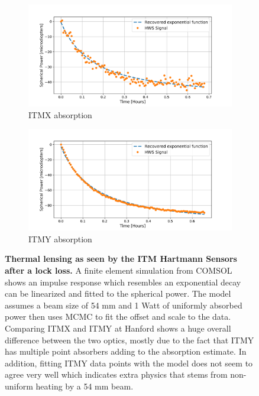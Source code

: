 	\begin{figure}[!]
		\centering
		\begin{subfigure}[a]{0.8\textwidth}
			\centering
			\includegraphics[width=\textwidth]{../Figures/MCMC_ITMX_ABS_FIT.png}
			\caption{ITMX absorption}
			\label{fig:itmx_abs}
		\end{subfigure}
		\hfill
		\begin{subfigure}[b]{0.8\textwidth}
			\centering
			\includegraphics[width=\textwidth]{../Figures/MCMC_ITMY_ABS_FIT.png}
			\caption{ITMY absorption}
			\label{fig:itmy_abs}
		\end{subfigure}
		\caption[Thermal lensing as seen by the ITM Hartmann Sensors after a lock loss.]  
		{\textbf{Thermal lensing as seen by the ITM Hartmann Sensors after a lock loss.} A finite element simulation from COMSOL shows an impulse response which resembles an exponential decay can be linearized and fitted to the spherical power. The model assumes a beam size of 54 mm and 1 Watt of uniformly absorbed power then uses MCMC to fit the offset and scale to the data. Comparing ITMX and ITMY at Hanford shows a huge overall difference between the two optics, mostly due to the fact that ITMY has multiple point absorbers adding to the absorption estimate.  In addition, fitting ITMY data points with the model does not seem to agree very well which indicates extra physics that stems from non-uniform heating by a 54 mm beam.}
		\label{fig:hws_abs}
	\end{figure}
	
